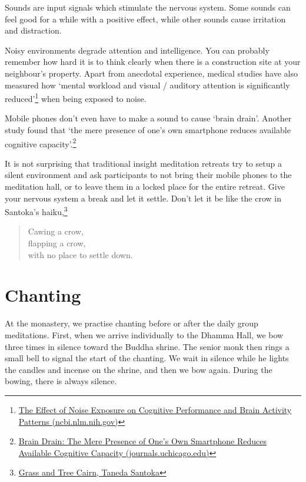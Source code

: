 Sounds are input signals which stimulate the nervous system. Some sounds
can feel good for a while with a positive effect, while other sounds
cause irritation and distraction.

Noisy environments degrade attention and intelligence. You can probably
remember how hard it is to think clearly when there is a construction
site at your neighbour's property. Apart from anecdotal experience,
medical studies have also measured how `mental workload and visual /
auditory attention is significantly reduced'\footnote{\href{https://www.ncbi.nlm.nih.gov/pmc/articles/PMC6901841/}{The
  Effect of Noise Exposure on Cognitive Performance and Brain Activity
  Patterns (ncbi.nlm.nih.gov)}} when being exposed to noise.

Mobile phones don't even have to make a sound to cause `brain drain'.
Another study found that `the mere presence of one's own smartphone
reduces available cognitive capacity'.\footnote{\href{https://www.journals.uchicago.edu/doi/10.1086/691462}{Brain
  Drain: The Mere Presence of One's Own Smartphone Reduces Available
  Cognitive Capacity (journals.uchicago.edu)}}

It is not surprising that traditional insight meditation retreats try to
setup a silent environment and ask participants to not bring their
mobile phones to the meditation hall, or to leave them in a locked place
for the entire retreat. Give your nervous system a break and let it
settle. Don't let it be like the crow in Santoka's haiku,\footnote{\href{https://www.goodreads.com/book/show/931086.Grass_and_Tree_Cairn}{Grass
  and Tree Cairn, Taneda Santoka}}

\begin{quote}
Cawing a crow,\\
flapping a crow,\\
with no place to settle down.
\end{quote}

\section{Chanting}


\noindent At the monastery, we practise chanting before or after the
daily group meditations. First, when we arrive individually to the
Dhamma Hall, we bow three times in silence toward the Buddha shrine. The
senior monk then rings a small bell to signal the start of the chanting.
We wait in silence while he lights the candles and incense on the
shrine, and then we bow again. During the bowing, there is always
silence.

